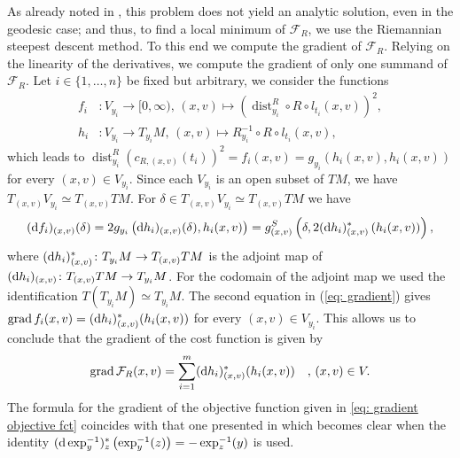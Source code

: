 \documentclass[11pt,a4paper]{article}
\theoremstyle{plain}
\theoremstyle{definition}
\DeclareMathOperator{\grad}{grad}
\DeclareMathOperator{\dist}{dist}
\begin{document}
As already noted in \cite{fletcher2013}, this problem does not yield an analytic solution, even in the geodesic case; and thus, to find a local minimum of $\mathcal{F}_R$, we use the Riemannian steepest descent method. To this end we compute the gradient of $\mathcal{F}_R$. Relying on the linearity of the derivatives, we compute the gradient of only one summand of $\mathcal{F}_R$. Let $i\in\{1, \ldots, n\}$ be fixed but arbitrary, we consider the functions
\begin{align}
	\label{map: auxillary maps}
	f_i & \colon V_{y_i}\to [0, \infty),  \, (x,v) \mapsto \left(\dist_{y_i}^{R}\circ R\circ l_{t_i}(x,v)\right)^2,\\ 
	\nonumber
	h_i& \colon V_{y_i}\to T_{y_i}M, \, (x,v) \mapsto R_{y_i}^{-1}\circ R\circ l_{t_i}(x,v),
\end{align}
which leads to $\dist_{y_i}^{R}\left(c_{R,(x, v)}(t_i)\right)^2 = f_i(x, v) = g_{y_i}\left(h_i(x, v), h_i(x, v)\right)$ for every $(x, v)\in V_{y_i}$. 
Since each $V_{y_i}$ is an open subset of $TM$, we have $T_{(x, v)}V_{y_i}\simeq T_{(x, v)}TM$.
For $\delta\in T_{(x, v)}V_{y_i}\simeq T_{(x, v)}TM$ we have
\begin{equation}
	\label{eq: gradient}
	(\textup{d}f_i)_{(x, v)}(\delta)
	= 2 g_{y_i}\left(\textup{d}h_i)_{(x, v)}(\delta), h_i(x, v)\right) 
	= g^S_{(x, v)}\left(\delta, 2(\textup{d}h_i)_{(x, v)}^*\left(h_i(x, v)\right)\right),
\end{equation}
where $(\textup{d}h_i)_{(x, v)}^*\colon T_{y_i}M\to T_{(x, v)}TM$ is the adjoint map of $(\textup{d}h_i)_{(x, v)}\colon T_{(x, v)}TM\to T_{y_i}M$. For the codomain of the adjoint map we used the identification $T(T_{y_i}M)\simeq T_{y_i}M$. The second equation in (\ref{eq: gradient}) gives $\grad f_i(x, v) = (\textup{d}h_i)_{(x, v)}^*(h_i(x, v))$ for every $(x, v)\in V_{y_i}$. This allows us to conclude that the gradient of the cost function is given by 
\begin{equation}
	\label{eq: gradient objective fct}
	\grad \mathcal{F}_R (x, v)
	= \sum\limits_{i = 1}^m (\textup{d}h_i)_{(x, v)}^*(h_i(x, v))\quad , \, (x, v)\in V.
\end{equation}
The formula for the gradient of the objective function given in \eqref{eq: gradient objective fct} coincides with that one presented in \cite{fletcher2013} which becomes clear when the identity $(\textup{d}\exp^{-1}_y)_z^*\left(\exp^{-1}_y(z)\right) = - \exp^{-1}_z(y)$ is used.
\end{document}
